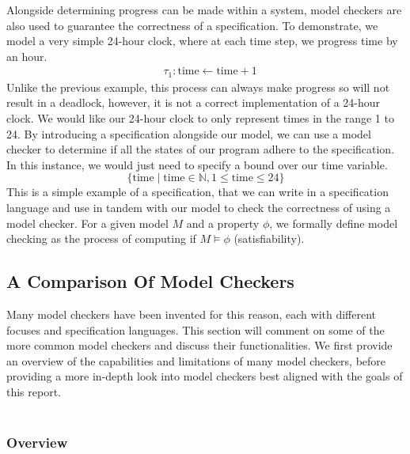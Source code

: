 Alongside determining progress can be made within a system, model checkers are also used to guarantee the correctness of a specification. To demonstrate, we model a very simple 24-hour clock, where at each time step, we progress time by an hour.
\[
\begin{aligned}
& \tau_1: \text{time} \leftarrow \text{time} + 1
\end{aligned}
\]
Unlike the previous example, this process can always make progress so will not result in a deadlock, however, it is not a correct implementation of a 24-hour clock. We would like our 24-hour clock to only represent times in the range 1 to 24. By introducing a specification alongside our model, we can use a model checker to determine if all the states of our program adhere to the specification. In this instance, we would just need to specify a bound over our time variable.
\[
\{ \text{time} \mid \text{time} \in \mathbb{N}, 1 \leq \text{time} \leq 24 \}
\]
This is a simple example of a specification, that we can write in a specification language and use in tandem with our model to check the correctness of using a model checker. For a given model $M$ and a property $\phi$, we formally define model checking as the process of computing if $M \models \phi$ (satisfiability).
\subsection{A Comparison Of Model Checkers}
Many model checkers have been invented for this reason, each with different focuses and specification languages. This section will comment on some of the more common model checkers and discuss their functionalities. We first provide an overview of the capabilities and limitations of many model checkers, before providing a more in-depth look into model checkers best aligned with the goals of this report.
\\ \\
\subsubsection{Overview}

